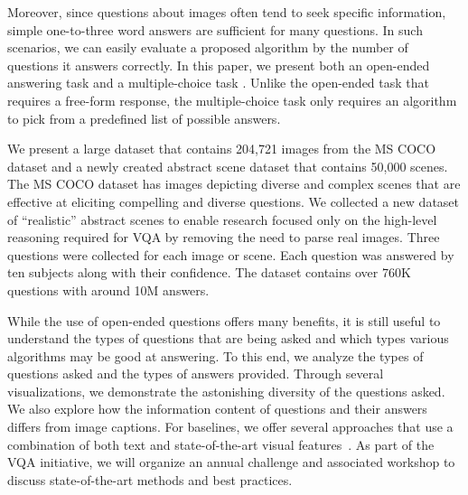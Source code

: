  Moreover, since questions about images often tend to seek specific information, simple one-to-three word answers are sufficient for many questions. In such scenarios, we can easily evaluate a proposed algorithm by the number of questions it answers correctly.
In this paper, we present both an open-ended answering task and a multiple-choice
task \cite{richardson2013mctest,FITB_VP}. Unlike the open-ended task that requires a
free-form response, the multiple-choice task only requires an algorithm to pick from a predefined
list of possible answers.  


We present a large dataset that contains 204,721 images from the MS COCO
dataset \cite{coco} and a newly created abstract scene dataset \cite{ZitnickCVPR2013,Antol2014}
that contains 50,000 scenes. The MS COCO dataset has images depicting diverse and complex scenes that are effective at eliciting compelling and diverse questions. We collected a new dataset of ``realistic'' abstract scenes to enable research focused only on the high-level reasoning required for VQA by removing the need to parse real images. Three questions were collected for each image or scene. Each question was answered by ten subjects along with their confidence. The dataset contains over 760K questions with around 10M answers.

While the use of open-ended questions offers many benefits, it is still useful to understand the types of questions that are being asked and which types various algorithms may be
good at answering. To this end, we analyze the types of questions asked and the types of answers provided.
Through several visualizations, we demonstrate the astonishing diversity of the questions asked. We also explore how the information content of questions and their answers differs from image captions.
For baselines, we offer several approaches that use a combination of both text and state-of-the-art
visual features~\cite{AlexNet}. As part of the VQA initiative, we will organize an annual challenge and
associated workshop to discuss state-of-the-art methods and best practices.

